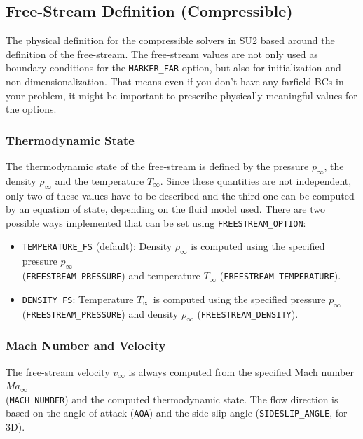 \documentclass{article}
\begin{document}
\subsection{Free-Stream Definition (Compressible)}
	The physical definition for the compressible solvers in SU2 based around the definition of the free-stream. The free-stream values are not only used as boundary conditions for the \verb|MARKER_FAR| option, but also for initialization and non-dimensionalization. That means even if you don’t have any farfield BCs in your problem, it might be important to prescribe physically meaningful values for the options.

\subsubsection{Thermodynamic State}

The thermodynamic state of the free-stream is defined by the pressure \(p_\infty\), the density \(\rho_\infty\) and the temperature \(T_\infty\). Since these quantities are not independent, only two of these values have to be described and the third one can be computed by an equation of state, depending on the fluid model used. There are two possible ways implemented that can be set using \verb|FREESTREAM_OPTION|:

\begin{itemize}
    \item \verb|TEMPERATURE_FS| (default): Density \(\rho_\infty\) is computed using the specified pressure \(p_\infty\) \\(\verb|FREESTREAM_PRESSURE|) and temperature \(T_\infty\) (\verb|FREESTREAM_TEMPERATURE|).
    \item \verb|DENSITY_FS|: Temperature \(T_\infty\) is computed using the specified pressure \(p_\infty\) \\ (\verb|FREESTREAM_PRESSURE|) and density \(\rho_\infty\) (\verb|FREESTREAM_DENSITY|).
\end{itemize}


\subsubsection{Mach Number and Velocity}

The free-stream velocity \(v_\infty\) is always computed from the specified Mach number \(Ma_\infty\) \\ (\verb|MACH_NUMBER|) and the computed thermodynamic state. The flow direction is based on the angle of attack (\verb|AOA|) and the side-slip angle (\verb|SIDESLIP_ANGLE|, for 3D).
\end{document}
